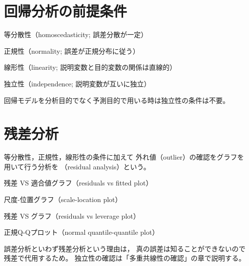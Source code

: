 \newcommand{\Draft}{}
\newcommand{\Slide}{}
\newcommand{\PrintLecture}{1}
\newcommand{\PrintSolution}{0}








\maketitle

\MyFrame{}{\tableofcontents}

\section{回帰分析の前提条件}

\MyFrame{}
{
  {
    \MyEnums
    {
      \item 等分散性（homoscedasticity; 誤差分散が一定）
      \item 正規性（normality; 誤差が正規分布に従う）
      \item 線形性（linearity; 説明変数と目的変数の関係は直線的）
      \item 独立性（independence; 説明変数が互いに独立）
    }
  }
  回帰モデルを分析目的でなく予測目的で用いる時は独立性の条件は不要。
}

\section{残差分析}

\MyFrame{}
{
  {
    等分散性，正規性，線形性の条件に加えて
    外れ値（outlier）の確認をグラフを用いて行う分析を
    （residual analysis）という。
    \MyEnums
    {
      \item 残差 VS 適合値グラフ（residuals vs fitted plot） 
      \item 尺度-位置グラフ（scale-location plot） 
      \item 残差 VS グラフ（residuals vs leverage plot） 
      \item 正規Q-Qプロット（normal quantile-quantile plot） 
    }
  }
  誤差分析といわず残差分析という理由は，
  真の誤差は知ることができないので残差で代用するため。
  独立性の確認は「多重共線性の確認」の章で説明する。
}

